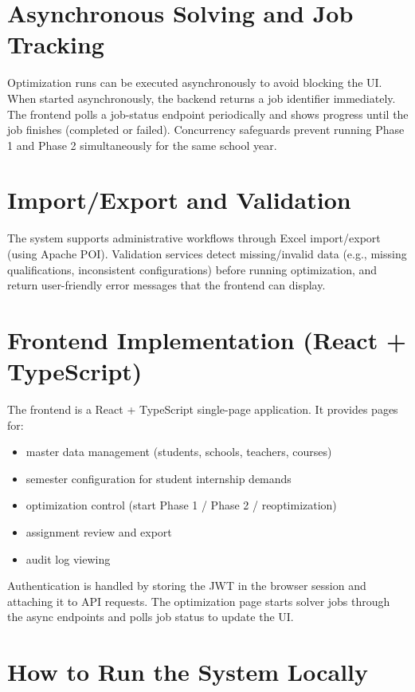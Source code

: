 \documentclass[12pt,a4paper]{report}
\begin{document}
\section{Asynchronous Solving and Job Tracking}

Optimization runs can be executed asynchronously to avoid blocking the UI. When started asynchronously, the backend returns a job identifier immediately. The frontend polls a job-status endpoint periodically and shows progress until the job finishes (completed or failed). Concurrency safeguards prevent running Phase 1 and Phase 2 simultaneously for the same school year.

\section{Import/Export and Validation}

The system supports administrative workflows through Excel import/export (using Apache POI). Validation services detect missing/invalid data (e.g., missing qualifications, inconsistent configurations) before running optimization, and return user-friendly error messages that the frontend can display.

\section{Frontend Implementation (React + TypeScript)}

The frontend is a React + TypeScript single-page application. It provides pages for:

\begin{itemize}
    \item master data management (students, schools, teachers, courses)
    \item semester configuration for student internship demands
    \item optimization control (start Phase 1 / Phase 2 / reoptimization)
    \item assignment review and export
    \item audit log viewing
\end{itemize}

Authentication is handled by storing the JWT in the browser session and attaching it to API requests. The optimization page starts solver jobs through the async endpoints and polls job status to update the UI.

\section{How to Run the System Locally}
\end{document}
